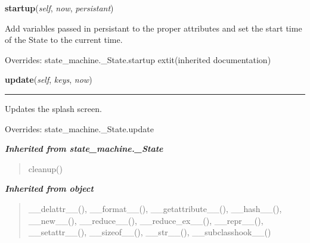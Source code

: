     \vspace{0.5ex}

\hspace{.8\funcindent}\begin{boxedminipage}{\funcwidth}

    \raggedright \textbf{startup}(\textit{self}, \textit{now}, \textit{persistant})

\setlength{\parskip}{2ex}
    Add variables passed in persistant to the proper attributes and set the
    start time of the State to the current time.

\setlength{\parskip}{1ex}
      Overrides: state\_machine.\_State.startup 	extit{(inherited documentation)}

    \end{boxedminipage}

    \vspace{0.5ex}

\hspace{.8\funcindent}\begin{boxedminipage}{\funcwidth}

    \raggedright \textbf{update}(\textit{self}, \textit{keys}, \textit{now})

    \vspace{-1.5ex}

    \rule{\textwidth}{0.5\fboxrule}
\setlength{\parskip}{2ex}
    Updates the splash screen.

\setlength{\parskip}{1ex}
      Overrides: state\_machine.\_State.update

    \end{boxedminipage}


\large{\textbf{\textit{Inherited from state\_machine.\_State}}}

\begin{quote}
cleanup()
\end{quote}

\large{\textbf{\textit{Inherited from object}}}

\begin{quote}
\_\_delattr\_\_(), \_\_format\_\_(), \_\_getattribute\_\_(), \_\_hash\_\_(), \_\_new\_\_(), \_\_reduce\_\_(), \_\_reduce\_ex\_\_(), \_\_repr\_\_(), \_\_setattr\_\_(), \_\_sizeof\_\_(), \_\_str\_\_(), \_\_subclasshook\_\_()
\end{quote}


